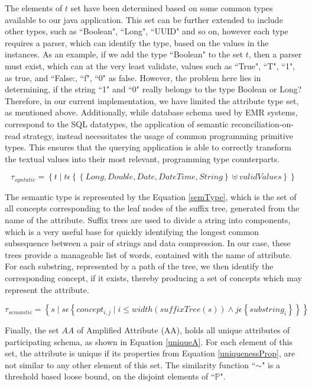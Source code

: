 The elements of $t$ set have been determined based on some common types available to our java application. This set can be further extended to include other types, such as ``Boolean", ``Long", ``UUID" and so on, however each type requires a parser, which can identify the type, based on the values in the instances. As an example, if we add the type ``Boolean" to the set $t$, then a parser must exist, which can at the very least validate, values such as ``True", ``T", ``1", as true, and ``False:, ``f", ``0" as false. However, the problem here lies in determining, if the string ``1" and ``0" really belongs to the type Boolean or Long? Therefore, in our current implementation, we have limited the attribute type set, as mentioned above.
Additionally, while database schema used by EMR systems, correspond to the SQL datatypes\cite{SQLDataTypes}, the application of semantic reconciliation-on-read strategy, instead necessitates the usage of common programming primitive types. This ensures that the querying application is able to correctly transform the textual values into their most relevant, programming type counterparts. 

\begin{equation}\label{synType}
\tau_{syntatic}= \left \{ t \mid t \epsilon \left \{ \left \{ Long, Double, Date, DateTime, String \right \} \uplus validValues \right \} \right \}
\end{equation}

The semantic type is represented by the Equation \eqref{semType}, which is the set of all concepts corresponding to the leaf nodes of the suffix tree, generated from the name of the attribute. Suffix trees are used to divide a string into components, which is a very useful base for quickly identifying the longest common subsequence between a pair of strings and data compression. In our case, these trees provide a manageable list of words, contained with the name of attribute. For each substring, represented by a path of the tree, we then identify the corresponding concept, if it exists, thereby producing a set of concepts which may represent the attribute.

\begin{equation}\label{semType}
\tau_{semantic}= \left \{s \mid s \epsilon \left \{ concept_{i,j} \mid i \leq width(suffixTree(s)) \wedge j \epsilon \left \{ substring_i \right \} \right \} \right \}
\end{equation}

Finally, the set $AA$ of Amplified Attribute (AA), holds all unique attributes of participating schema, as shown in Equation \eqref{uniqueA}. For each element of this set, the attribute is unique if its properties from Equation \eqref{uniquenessProp}, are not similar to any other element of this set. The similarity function ``$\sim$" is a threshold based loose bound, on the disjoint elements of ``$\mathbb{P}$".


